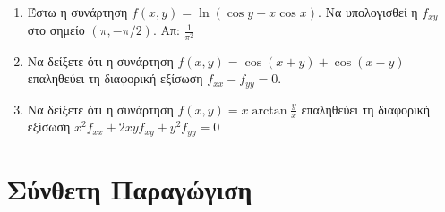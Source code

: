 \begin{enumerate}
  \item Έστω η συνάρτηση $f(x,y)=\ln\left(\cos y+x\cos x\right)$.  Να υπολογισθεί 
    η $ f_{xy} $ στο σημείο $(\pi,-\pi/2)$.  \hfill Απ: $\frac{1}{\pi^2}$



  \item Να δείξετε ότι η συνάρτηση $ f(x,y) = \cos{(x+y)} + \cos{(x-y)} $ 
    επαληθεύει τη διαφορική εξίσωση $ f_{xx} - f_{yy} = 0 $.

  \item Να δείξετε ότι η συνάρτηση $ f(x,y) = x \arctan{\frac{y}{x}} $ 
    επαληθεύει τη διαφορική εξίσωση $ x^{2} f_{xx} + 2xyf_{xy} + y^{2} f_{yy} = 0 $ 
\end{enumerate}


\section*{Σύνθετη Παραγώγιση}

